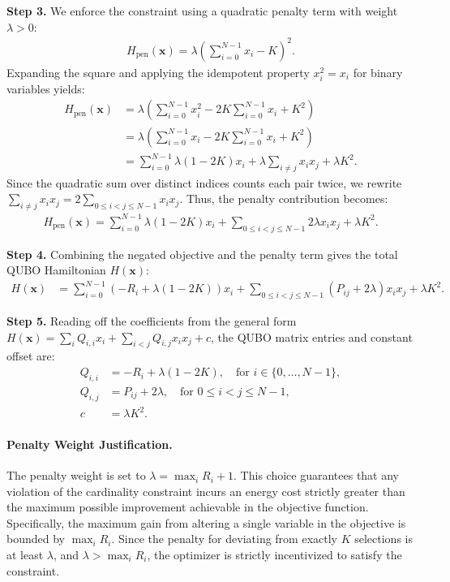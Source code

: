 \documentclass[12pt]{article}
\begin{document}
\textbf{Step 3.} We enforce the constraint using a quadratic penalty term with weight $\lambda > 0$:
\begin{align}
    H_{\text{pen}}(\mathbf{x}) = \lambda \left( \sum_{i=0}^{N-1} x_i - K \right)^2.
\end{align}
Expanding the square and applying the idempotent property $x_i^2 = x_i$ for binary variables yields:
\begin{align}
    H_{\text{pen}}(\mathbf{x}) &= \lambda \left( \sum_{i=0}^{N-1} x_i^2 - 2K \sum_{i=0}^{N-1} x_i + K^2 \right) \\
    &= \lambda \left( \sum_{i=0}^{N-1} x_i - 2K \sum_{i=0}^{N-1} x_i + K^2 \right) \\
    &= \sum_{i=0}^{N-1} \lambda(1 - 2K) x_i + \lambda \sum_{i \neq j} x_i x_j + \lambda K^2.
\end{align}
Since the quadratic sum over distinct indices counts each pair twice, we rewrite $\sum_{i \neq j} x_i x_j = 2 \sum_{0 \le i < j \le N-1} x_i x_j$. Thus, the penalty contribution becomes:
\begin{align}
    H_{\text{pen}}(\mathbf{x}) = \sum_{i=0}^{N-1} \lambda(1 - 2K) x_i + \sum_{0 \le i < j \le N-1} 2\lambda x_i x_j + \lambda K^2.
\end{align}

\textbf{Step 4.} Combining the negated objective and the penalty term gives the total QUBO Hamiltonian $H(\mathbf{x})$:
\begin{align}
    H(\mathbf{x}) &= \sum_{i=0}^{N-1} \left( -R_i + \lambda(1 - 2K) \right) x_i + \sum_{0 \le i < j \le N-1} \left( P_{ij} + 2\lambda \right) x_i x_j + \lambda K^2.
\end{align}

\textbf{Step 5.} Reading off the coefficients from the general form $H(\mathbf{x}) = \sum_{i} Q_{i,i} x_i + \sum_{i < j} Q_{i,j} x_i x_j + c$, the QUBO matrix entries and constant offset are:
\begin{align}
    Q_{i,i} &= -R_i + \lambda(1 - 2K), \quad \text{for } i \in \{0, \dots, N-1\}, \\
    Q_{i,j} &= P_{ij} + 2\lambda, \quad \text{for } 0 \le i < j \le N-1, \\
    c &= \lambda K^2.
\end{align}

\paragraph{Penalty Weight Justification.}
The penalty weight is set to $\lambda = \max_{i} R_i + 1$. This choice guarantees that any violation of the cardinality constraint incurs an energy cost strictly greater than the maximum possible improvement achievable in the objective function. Specifically, the maximum gain from altering a single variable in the objective is bounded by $\max_i R_i$. Since the penalty for deviating from exactly $K$ selections is at least $\lambda$, and $\lambda > \max_i R_i$, the optimizer is strictly incentivized to satisfy the constraint.
\end{document}
